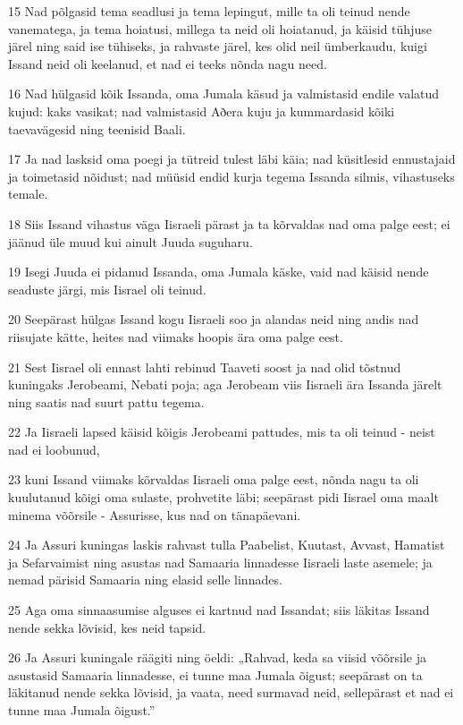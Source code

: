\par 15 Nad põlgasid tema seadlusi ja tema lepingut, mille ta oli teinud nende vanematega, ja tema hoiatusi, millega ta neid oli hoiatanud, ja käisid tühjuse järel ning said ise tühiseks, ja rahvaste järel, kes olid neil ümberkaudu, kuigi Issand neid oli keelanud, et nad ei teeks nõnda nagu need.
\par 16 Nad hülgasid kõik Issanda, oma Jumala käsud ja valmistasid endile valatud kujud: kaks vasikat; nad valmistasid Aðera kuju ja kummardasid kõiki taevavägesid ning teenisid Baali.
\par 17 Ja nad lasksid oma poegi ja tütreid tulest läbi käia; nad küsitlesid ennustajaid ja toimetasid nõidust; nad müüsid endid kurja tegema Issanda silmis, vihastuseks temale.
\par 18 Siis Issand vihastus väga Iisraeli pärast ja ta kõrvaldas nad oma palge eest; ei jäänud üle muud kui ainult Juuda suguharu.
\par 19 Isegi Juuda ei pidanud Issanda, oma Jumala käske, vaid nad käisid nende seaduste järgi, mis Iisrael oli teinud.
\par 20 Seepärast hülgas Issand kogu Iisraeli soo ja alandas neid ning andis nad riisujate kätte, heites nad viimaks hoopis ära oma palge eest.
\par 21 Sest Iisrael oli ennast lahti rebinud Taaveti soost ja nad olid tõstnud kuningaks Jerobeami, Nebati poja; aga Jerobeam viis Iisraeli ära Issanda järelt ning saatis nad suurt pattu tegema.
\par 22 Ja Iisraeli lapsed käisid kõigis Jerobeami pattudes, mis ta oli teinud - neist nad ei loobunud,
\par 23 kuni Issand viimaks kõrvaldas Iisraeli oma palge eest, nõnda nagu ta oli kuulutanud kõigi oma sulaste, prohvetite läbi; seepärast pidi Iisrael oma maalt minema võõrsile - Assurisse, kus nad on tänapäevani.
\par 24 Ja Assuri kuningas laskis rahvast tulla Paabelist, Kuutast, Avvast, Hamatist ja Sefarvaimist ning asustas nad Samaaria linnadesse Iisraeli laste asemele; ja nemad pärisid Samaaria ning elasid selle linnades.
\par 25 Aga oma sinnaasumise alguses ei kartnud nad Issandat; siis läkitas Issand nende sekka lõvisid, kes neid tapsid.
\par 26 Ja Assuri kuningale räägiti ning öeldi: „Rahvad, keda sa viisid võõrsile ja asustasid Samaaria linnadesse, ei tunne maa Jumala õigust; seepärast on ta läkitanud nende sekka lõvisid, ja vaata, need surmavad neid, sellepärast et nad ei tunne maa Jumala õigust.”

